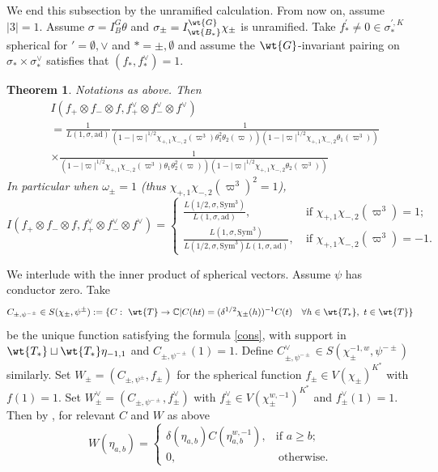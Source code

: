 \documentclass[11pt,reqno]{amsart}
\newcommand{\BC}{{\mathbb {C}}} \newcommand{\BD}{{\mathbb {D}}}
\newcommand{\ad}{{\mathrm{ad}}}\newcommand{\al}{{\mathrm{al}}}
\newcommand{\Sym}{{\mathrm{Sym}}}\newcommand{\sgn}{{\mathrm{sgn}}}
\theoremstyle{plain}
\newtheorem{thm}{Theorem}[section] \newtheorem{cor}[thm]{Corollary}
\theoremstyle{remark} \newtheorem{remark}[thm]{Remark}
\theoremstyle{definition} \newtheorem{exercise}[thm]{Exercise}
\theoremstyle{definition} \newtheorem{example}[thm]{Example} \newtheorem{condition}[thm]{Condition}
\numberwithin{equation}{section}
\renewcommand{\-}{\text{--}}
\begin{document}
We end this subsection by the unramified calculation. From now on, assume  $|3|=1$.  Assume  $\sigma=I_B^G\theta$ and $\sigma_\pm=I_{\wt{B_*}}^{\wt{G}}\chi_{\pm}$ is unramified. Take $f_*^\prime\neq0\in \sigma_*^{\prime,K}$  spherical  for $\prime=\emptyset,\vee$ and $*=\pm,\emptyset$ and assume the $\wt{G}$-invariant pairing on $\sigma_*\times\sigma_*^\vee$ satisfies that $(f_*,f_*^\vee)=1$.
\begin{thm}\label{unramified calculation}Notations as above. Then
\begin{align*}
    &I(f_+\otimes f_-\otimes f, f_+^\vee\otimes f_-^\vee\otimes f^\vee)\\
    &=\frac{1}{L(1,\sigma,\ad)}\frac{1}{(1-|\varpi|^{1/2}\chi_{+,1}\chi_{-,2}(\varpi^3)\theta_1^2\theta_2(\varpi))(1-|\varpi|^{1/2}\chi_{+,1}\chi_{-,2}
\theta_1(\varpi^3))}\\
&\times\frac{1}{(1-|\varpi|^{1/2}\chi_{+,1}\chi_{-,2}(\varpi^3)\theta_1\theta_2^2(\varpi))(1-|\varpi|^{1/2}\chi_{+,1}\chi_{-,2}\theta_2(\varpi^3))}
\end{align*}
In particular when $\omega_\pm=1$ (thus $\chi_{+,1}\chi_{-,2}(\varpi^3)^2=1$), 
\[I( f_+\otimes f_-\otimes f, f_+^\vee\otimes f_-^\vee\otimes f^\vee)=\begin{cases}\frac{L(1/2,\sigma,\Sym^3)}{L(1,\sigma,\ad)}, &\  \text{if }\chi_{+,1}\chi_{-,2}(\varpi^3)=1;\\
\frac{L(1,\sigma,\Sym^3)}{L(1/2,\sigma,\Sym^3)L(1,\sigma,\ad)}, &\ \text{if }\chi_{+,1}\chi_{-,2}(\varpi^3)=-1.\end{cases}\]
\end{thm}
We interlude with the inner product of spherical vectors. Assume  $\psi$ has conductor zero. Take
\[C_{\pm,\psi^{-\pm}}\in S(\chi_\pm,\psi^{\pm}):=\{C:\ \wt{T}\to\BC| C(ht)=(\delta^{1/2}\chi_\pm(h))^{-1}C(t)\quad\forall h\in \wt{T_*},\ t\in \wt{T}\}\] be the unique function satisfying  the formula \ref{cons}, with support  in $\wt{T_*}\sqcup \wt{T_*}\eta_{-1,1}$ and   $C_{\pm,\psi^{-\pm}}(1)=1$. Define $C_{\pm,\psi^{-\pm}}^\vee\in S(\chi_{\pm}^{-1,w},\psi^{-\pm})$ similarly.
Set $W_{\pm}=(C_{\pm,\psi^{\pm}},f_\pm)$ for the spherical function $f_\pm\in V(\chi_\pm)^{K^*}$ with $f(1)=1$. Set $W_{\pm}^\vee=(C_{\pm,\psi^{-\pm}},f_\pm^\vee)$
with  $f_{\pm}^\vee\in V(\chi_{\pm}^{w,-1})^{K^*}$ and $f_\pm^\vee(1)=1$. Then  by \cite[Theorem I.4.2]{KP84}, for relevant $C$ and $W$ as above   \[W(\eta_{a,b})=\begin{cases}\delta(\eta_{a,b})C(\eta_{a,b}^{w,-1}), & 
\text{if }a\geq b;\\
0, &\ \text{otherwise.}\end{cases}\]
\end{document}
